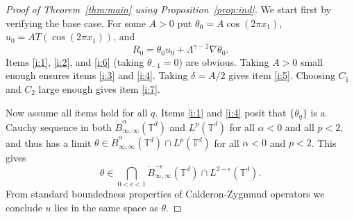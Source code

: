 \documentclass[10pt,a4paper]{amsart}
\newcommand{\T}{\mathbb T}
\begin{document}
\begin{proof}[Proof of Theorem~\ref{thm:main} using Proposition~\ref{prop:ind}]
We start first by verifying the base case. For some $A > 0$ put $\theta_0 = A\cos(2\pi x_1)$, $u_0 = AT(\cos(2\pi x_1))$, and
$$
R_0 = \theta_0 u_0 + \Lambda^{\gamma - 2} \nabla \theta_0.
$$
Items \ref{i:1}, \ref{i:2}, and \ref{i:6} (taking $\theta_{-1} = 0$) are obvious. Taking $A > 0$ small enough ensures items \ref{i:3} and \ref{i:4}. Taking $\delta = A/2$ gives item \ref{i:5}. Choosing $C_1$ and $C_2$ large enough gives item \ref{i:7}.

Now assume all items hold for all $q$. Items \ref{i:1} and \ref{i:4} posit that $\{\theta_q\}$ is a Cauchy sequence in both $\dot{B}^\alpha_{\infty,\infty}(\T^d)$ and $L^p(\T^d)$ for all $\alpha < 0$ and all $p < 2$, and thus has a limit $\theta \in \dot{B}^\alpha_{\infty,\infty}(\T^d) \cap L^p(\T^d)$ for all $\alpha < 0$ and $p < 2$. This gives
$$
\theta \in \bigcap_{0 < \epsilon < 1} \dot{B}^{-\epsilon}_{\infty,\infty}(\T^d) \cap L^{2-\epsilon}(\T^d).
$$
From standard boundedness properties of Calderon-Zygmund operators we conclude $u$ lies in the same space as $\theta$.


\end{proof}
\end{document}
